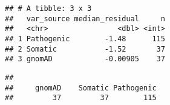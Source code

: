 \documentclass[
]{article}
\newenvironment{Shaded}{\begin{snugshade}}{\end{snugshade}}
\newcommand{\AttributeTok}[1]{\textcolor[rgb]{0.13,0.29,0.53}{#1}}
\newcommand{\FunctionTok}[1]{\textcolor[rgb]{0.13,0.29,0.53}{\textbf{#1}}}
\newcommand{\NormalTok}[1]{#1}
\newcommand{\OtherTok}[1]{\textcolor[rgb]{0.56,0.35,0.01}{#1}}
\newcommand{\SpecialCharTok}[1]{\textcolor[rgb]{0.81,0.36,0.00}{\textbf{#1}}}
\newcommand{\StringTok}[1]{\textcolor[rgb]{0.31,0.60,0.02}{#1}}
\begin{document}
\begin{verbatim}
## # A tibble: 3 x 3
##   var_source median_residual     n
##   <chr>                <dbl> <int>
## 1 Pathogenic        -1.48      115
## 2 Somatic           -1.52       37
## 3 gnomAD            -0.00905    37
\end{verbatim}

\begin{Shaded}
\end{Shaded}

\begin{verbatim}
## 
##     gnomAD    Somatic Pathogenic 
##         37         37        115
\end{verbatim}
\end{document}
